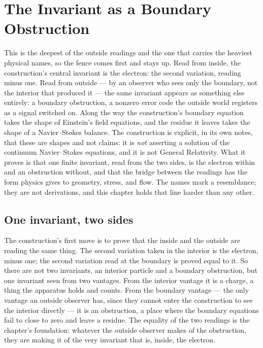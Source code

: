 \chapter{The Invariant as a Boundary Obstruction}
\label{chap:invariant-boundary-obstruction}

This is the deepest of the outside readings and the one that carries the heaviest physical names, so the
fence comes first and stays up. Read from inside, the construction's central invariant is the electron:
the second variation, reading minus one. Read from outside --- by an observer who sees only the boundary,
not the interior that produced it --- the same invariant appears as something else entirely: a boundary
obstruction, a nonzero error code the outside world registers as a signal switched on. Along the way the
construction's boundary equation takes the shape of Einstein's field equations, and the residue it leaves
takes the shape of a Navier--Stokes balance. The construction is explicit, in its own notes, that these
are shapes and not claims: it is \emph{not} asserting a solution of the continuum Navier--Stokes
equations, and it is not General Relativity. What it proves is that one finite invariant, read from the
two sides, is the electron within and an obstruction without, and that the bridge between the readings
has the form physics gives to geometry, stress, and flow. The names mark a resemblance; they are not
derivations, and this chapter holds that line harder than any other.

\section{One invariant, two sides}
\label{se:one-invariant-two-sides}

The construction's first move is to prove that the inside and the outside are reading the same thing. The
second variation taken in the interior is the electron, minus one; the second variation read at the
boundary is proved equal to it. So there are not two invariants, an interior particle and a boundary
obstruction, but one invariant seen from two vantages. From the interior vantage it is a charge, a thing
the apparatus holds and counts. From the boundary vantage --- the only vantage an outside observer has,
since they cannot enter the construction to see the interior directly --- it is an obstruction, a place
where the boundary equations fail to close to zero and leave a residue. The equality of the two readings
is the chapter's foundation: whatever the outside observer makes of the obstruction, they are making it
of the very invariant that is, inside, the electron.

